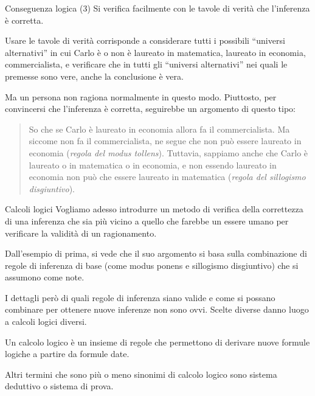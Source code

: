 \documentclass[aspectratio=169,10pt,dvipsnames,xcolor=table,handout]{beamer}
\begin{document}
\begin{frame}{Conseguenza logica (3)}
    Si verifica facilmente con le tavole di verità che l'inferenza è corretta.

    \medskip
    Usare le tavole di verità corrisponde a considerare tutti i possibili ``universi alternativi'' in cui Carlo è o non è laureato in matematica, laureato in economia, commercialista, e verificare che in tutti gli ``universi alternativi'' nei quali le premesse sono vere, anche la conclusione è vera.

    \medskip
    Ma un persona non ragiona normalmente in questo modo. Piuttosto, per convincersi che l'inferenza è corretta, seguirebbe un argomento di questo tipo:

    \smallskip
    \begin{quote}
        So che se Carlo è laureato in economia allora fa il commercialista. Ma siccome non fa il commercialista, ne segue che non può essere laureato in economia (\textit{regola del modus tollens}). Tuttavia, sappiamo anche che Carlo è laureato o in matematica o in economia, e non essendo laureato in economia non può che essere laureato in matematica (\textit{regola del sillogismo disgiuntivo}).
    \end{quote}
\end{frame}

\begin{frame}{Calcoli logici}
    Vogliamo adesso introdurre un metodo di verifica della correttezza di una inferenza che sia più vicino a quello che farebbe un essere umano per verificare la validità di un ragionamento.

    \medskip
    Dall'esempio di prima, si vede che il suo argomento si basa sulla combinazione di regole di inferenza di base (come modus ponens e sillogismo disgiuntivo) che si assumono come note.

    \medskip
    I dettagli però di quali regole di inferenza siano valide e come si possano combinare per ottenere nuove inferenze non sono ovvi. Scelte diverse danno luogo a \alert{calcoli logici} diversi.

    \begin{definition}
        Un \alert{calcolo logico} è un insieme di regole che permettono di derivare nuove formule logiche a partire da formule date.

        \smallskip
        Altri termini che sono più o meno sinonimi di calcolo logico sono \alert{sistema deduttivo} o \alert{sistema di prova}.
    \end{definition}
\end{frame}
\end{document}
